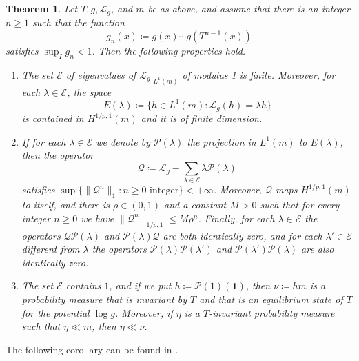 \documentclass[12pt]{amsart}
\numberwithin{equation}{section} %
\numberwithin{figure}{section} %
\theoremstyle{plain}
\newtheorem{theo}{Theorem}
\theoremstyle{definition}
\theoremstyle{remark}
\theoremstyle{citing}
\renewcommand{\=}{\coloneqq}
\begin{document}
\begin{theo}\label{keller theo}
       Let $T, g, \mathscr{L}_g$, and $m$ be as above, and assume that there is an integer $n\geq 1$ such that the function
\begin{equation*}
    g_n(x) \= g(x)\cdots g(T^{n-1}(x))
\end{equation*}
satisfies $\sup_I g_n <1$. Then the following properties hold.
\begin{enumerate}
    \item[1.] The set $\mathscr{E}$ of eigenvalues of $\mathscr{L}_g|_{L^1(m)}$ of modulus 1 is finite. Moreover, for each $\lambda \in\mathscr{E}$, the space
    \begin{equation*}
        E(\lambda)\= \{h\in L^1(m) : \mathscr{L}_g(h) = \lambda h\}
    \end{equation*}
    is contained in $H^{1/p,1}(m)$ and it is of finite dimension.
    \item[2.] If for each $\lambda\in \mathscr{E}$ we denote by $\mathscr{P}(\lambda)$ the projection in $L^1(m)$ to $E(\lambda)$, then the operator 
    \begin{equation*}
        \mathscr{Q}\= \mathscr{L}_g - \sum_{\lambda\in \mathscr{E}}\lambda\mathscr{P}(\lambda)
    \end{equation*}
    satisfies $\sup\{\lVert \mathscr{Q}^n\rVert_1: n\geq0 \text{ integer}\}<+\infty$. Moreover, $\mathscr{Q}$ maps $H^{1/p,1}(m)$ to itself, and there is $\rho\in(0,1)$ and  a constant $M>0$ such that for every integer $n\geq0$ we have $\lVert \mathscr{Q}^n\lVert_{1/p,1}\leq M\rho^n$. Finally, for each $\lambda \in \mathscr{E}$ the operators $\mathscr{Q}\mathscr{P}(\lambda)$ and $\mathscr{P}(\lambda)\mathscr{Q}$ are both identically zero, and for each $\lambda'\in \mathscr{E}$ different from $\lambda$ the operators $\mathscr{P}(\lambda)\mathscr{P}(\lambda')$ and $\mathscr{P}(\lambda')\mathscr{P}(\lambda)$ are also identically zero.
    \item[3.] The set $\mathscr{E}$ contains $1$, and if we put $h\= \mathscr{P}(1)(\boldsymbol{1})$, then $\nu\= hm$ is a probability measure that is invariant by $T$ and that is an equilibrium state of $T$ for the potential $\log g$. Moreover, if $\eta$ is a $T$-invariant probability measure such that $\eta \ll m$, then $\eta \ll \nu$.
\end{enumerate}
\end{theo}
The following corollary can be found in \cite[Corollary 4.4]{Juan1}.
\end{document}
